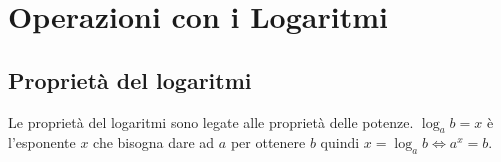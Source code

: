 \chapter{Operazioni con i Logaritmi}
\label{sec:Logaritmi}

\section{Proprietà del logaritmi}
Le proprietà del logaritmi sono legate alle proprietà delle potenze. $\log_ab=x$ è l'esponente $x$ che bisogna dare ad $a$ per ottenere $b$ quindi $x=\log_ab\Leftrightarrow a^{x}=b$. 
\label{sec:ProprietadelLogaritmi}
